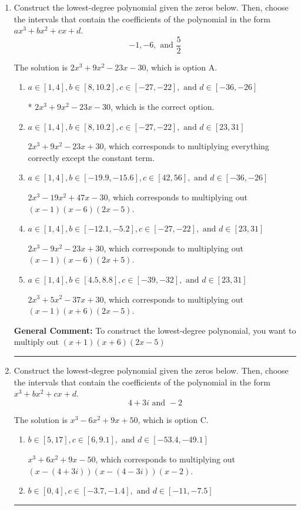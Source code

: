 \documentclass{extbook}[14pt]
\newcommand{\litem}[1]{\item #1

\rule{\textwidth}{0.4pt}}
\begin{document}
\begin{enumerate}\litem{
Construct the lowest-degree polynomial given the zeros below. Then, choose the intervals that contain the coefficients of the polynomial in the form $ax^3+bx^2+cx+d$.
\[ -1, -6, \text{ and } \frac{5}{2} \]

The solution is \( 2x^{3} +9 x^{2} -23 x -30 \), which is option A.\begin{enumerate}[label=\Alph*.]
\item \( a \in [1, 4], b \in [8, 10.2], c \in [-27, -22], \text{ and } d \in [-36, -26] \)

* $2x^{3} +9 x^{2} -23 x -30$, which is the correct option.
\item \( a \in [1, 4], b \in [8, 10.2], c \in [-27, -22], \text{ and } d \in [23, 31] \)

$2x^{3} +9 x^{2} -23 x + 30$, which corresponds to multiplying everything correctly except the constant term.
\item \( a \in [1, 4], b \in [-19.9, -15.6], c \in [42, 56], \text{ and } d \in [-36, -26] \)

$2x^{3} -19 x^{2} +47 x -30$, which corresponds to multiplying out $(x -1)(x -6)(2x -5)$.
\item \( a \in [1, 4], b \in [-12.1, -5.2], c \in [-27, -22], \text{ and } d \in [23, 31] \)

$2x^{3} -9 x^{2} -23 x + 30$, which corresponds to multiplying out $(x -1)(x -6)(2x + 5)$.
\item \( a \in [1, 4], b \in [4.5, 8.8], c \in [-39, -32], \text{ and } d \in [23, 31] \)

$2x^{3} +5 x^{2} -37 x + 30$, which corresponds to multiplying out $(x -1)(x + 6)(2x -5)$.
\end{enumerate}

\textbf{General Comment:} To construct the lowest-degree polynomial, you want to multiply out $(x + 1)(x + 6)(2x -5)$
}
\litem{
Construct the lowest-degree polynomial given the zeros below. Then, choose the intervals that contain the coefficients of the polynomial in the form $x^3+bx^2+cx+d$.
\[ 4 + 3 i \text{ and } -2 \]

The solution is \( x^{3} -6 x^{2} +9 x + 50 \), which is option C.\begin{enumerate}[label=\Alph*.]
\item \( b \in [5, 17], c \in [6, 9.1], \text{ and } d \in [-53.4, -49.1] \)

$x^{3} +6 x^{2} +9 x -50$, which corresponds to multiplying out $(x-(4 + 3 i))(x-(4 - 3 i))(x -2)$.
\item \( b \in [0, 4], c \in [-3.7, -1.4], \text{ and } d \in [-11, -7.5] \)


\end{enumerate}}
\end{enumerate}
\end{document}
